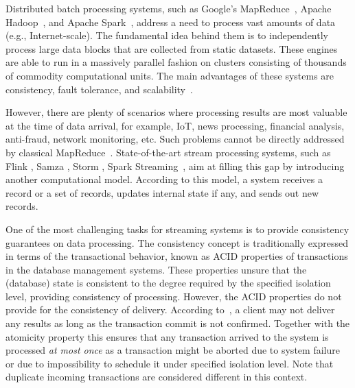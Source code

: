 
\label {fs-intro-seciton}

Distributed batch processing systems, such as Google's MapReduce~\cite{Dean:2008:MSD:1327452.1327492}, Apache Hadoop~\cite{hadoop2009hadoop}, and Apache Spark~\cite{Zaharia:2016:ASU:3013530.2934664}, address a need to process vast amounts of data (e.g., Internet-scale). The fundamental idea behind them is to independently process large data blocks that are collected from static datasets. These engines are able to run in a massively parallel fashion on clusters consisting of thousands of commodity computational units. The main advantages of these systems are consistency, fault tolerance, and scalability~\cite{borthakur2011apache}.

However, there are plenty of scenarios where processing results are most valuable at the time of data arrival, for example, IoT, news processing, financial analysis, anti-fraud, network monitoring, etc. Such problems cannot be directly addressed by classical MapReduce~\cite{Doulkeridis:2014:SLA:2628707.2628782}. State-of-the-art stream processing systems, such as Flink \cite{carbone2015apache}, Samza \cite{Noghabi:2017:SSS:3137765.3137770}, Storm \cite{apache:storm}, Spark Streaming~\cite{Zaharia:2012:DSE:2342763.2342773}, aim at filling this gap by introducing another computational model. According to this model, a system receives a record or a set of records, updates internal state if any, and sends out new records. 

One of the most challenging tasks for streaming systems is to provide consistency  guarantees on data processing. 
The consistency concept is traditionally expressed in terms of  the transactional behavior, known as ACID properties of transactions in the database management systems. These properties unsure that  the (database) state is consistent to the degree required by the specified isolation level, providing consistency of processing.   However, the ACID properties do not provide for the consistency of  delivery.  According to~\cite{DBLP:books/mk/WeikumV2002}, a client may not deliver any results as long as the transaction commit is not confirmed. Together with the atomicity property this ensures that any transaction arrived to the system is processed  {\em at most once} as a transaction  might be aborted due to system failure or due to impossibility to schedule it under specified isolation level. Note that duplicate incoming transactions are considered different in this context.   

